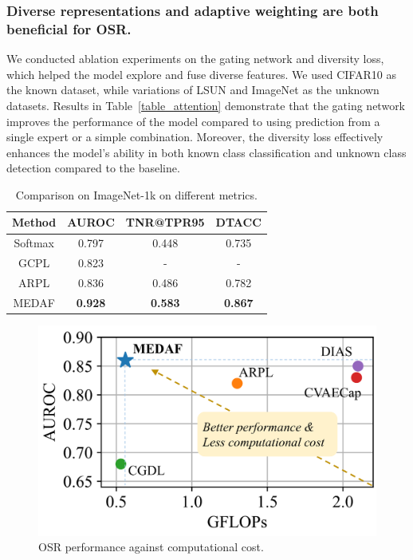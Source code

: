 \documentclass[letterpaper]{article} %
\begin{document}
\subsubsection{Diverse representations and adaptive weighting are both beneficial for OSR.} We conducted ablation experiments on the gating network and diversity loss, which helped the model explore and fuse diverse features. We used CIFAR10 as the known dataset, while variations of LSUN and ImageNet as the unknown datasets. Results in Table~\ref{table_attention} demonstrate that the gating network improves the performance of the model compared to using prediction from a single expert or a simple combination. Moreover, the diversity loss effectively enhances the model’s ability in both known class classification and unknown class detection compared to the baseline.
\begin{table}[t]
\small
\centering
\begin{tabular}{cccc}
\hline
Method & AUROC & TNR@TPR95 & DTACC \\ \hline 
Softmax & 0.797 & 0.448 & 0.735 \\ 
GCPL & 0.823 & - & - \\ 
ARPL & 0.836 & 0.486 & 0.782 \\  \hline
MEDAF & \textbf{0.928} & \textbf{0.583} & \textbf{0.867} \\\hline
\end{tabular}
\caption{Comparison on ImageNet-1k on different metrics.}
\label{table_imgn1k}
\end{table}

\begin{figure}[t]
  \begin{center}
    \includegraphics[width=0.75\linewidth]{Figs/Figure_gflops.pdf}
    \caption{OSR performance against computational cost.}
    \label{fig:Fig_gflops}
    \end{center}
\end{figure}
\end{document}
